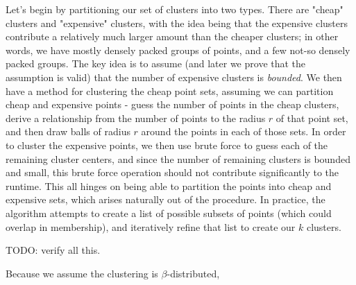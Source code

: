 \documentclass[paper=a4, fontsize=11pt]{scrartcl} %
\numberwithin{equation}{section} %
\numberwithin{figure}{section} %
\numberwithin{table}{section} %
\begin{document}
Let's begin by partitioning our set of clusters into two types.  There are  "cheap" clusters and "expensive" clusters, with the idea being that the expensive clusters contribute a relatively much larger amount than the cheaper clusters; in other words, we have mostly densely packed groups of points, and a few not-so densely packed groups.  The key idea is to assume (and later we prove that the assumption is valid) that the number of expensive clusters is \emph{bounded}.  We then have a method for clustering the cheap point sets, assuming we can partition cheap and expensive points - guess the number of points in the cheap clusters, derive a relationship from the number of points to the radius $r$ of that point set, and then draw balls of radius $r$ around the points in each of those sets.  In order to cluster the expensive points, we then use brute force to guess each of the remaining cluster centers, and since the number of remaining clusters is bounded and small, this brute force operation should not contribute significantly to the runtime.  This all hinges on being able to partition the points into cheap and expensive sets, which arises naturally out of the procedure.  In practice, the algorithm attempts to create a list of possible subsets of points (which could overlap in membership), and iteratively refine that list to create our $k$ clusters.

TODO: verify all this.

Because we assume the clustering is $\beta$-distributed, 
\end{document}
